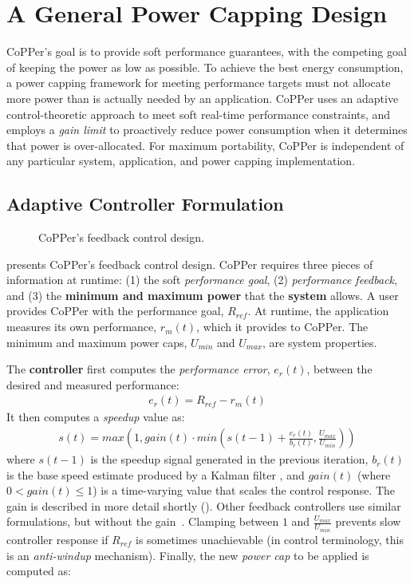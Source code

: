\section{A General Power Capping Design}
\label{sec:copper-framework}

CoPPer's goal is to provide soft performance guarantees, with the competing goal of keeping the power as low as possible.
To achieve the best energy consumption, a power capping framework for meeting performance targets must not allocate more power than is actually needed by an application.
CoPPer uses an adaptive control-theoretic approach to meet soft real-time performance constraints, and employs a \emph{gain limit} to proactively reduce power consumption when it determines that power is over-allocated.
For maximum portability, CoPPer is independent of any particular system, application, and power capping implementation.


\subsection{Adaptive Controller Formulation}

\begin{figure}[t]
  \centering
  
  \caption{CoPPer's feedback control design.}
  \label{fig:copper-runtime}
\end{figure}

 presents CoPPer's feedback control design.
CoPPer requires three pieces of information at runtime: (1) the soft \emph{performance goal}, (2) \emph{performance feedback}, and (3) the \textbf{minimum and maximum power} that the \textbf{system} allows.
A user provides CoPPer with the performance goal, $R_{ref}$.
At runtime, the application measures its own performance, $r_m(t)$, which it provides to CoPPer.
The minimum and maximum power caps, $U_{min}$ and $U_{max}$, are system properties.

The \textbf{controller} first computes the \emph{performance error}, $e_r(t)$, between the desired and measured performance:
\begin{eqnarray}
  e_r(t) = R_{ref} - r_m(t)
  \label{eqn:copper-error}
\end{eqnarray}
It then computes a \emph{speedup} value as:
\begin{eqnarray}
  s(t) = max\left(1, gain(t) \cdot min\left(s(t-1) + \frac{e_r(t)}{b_r(t)}, \frac{U_{max}}{U_{min}}\right)\right)
  \label{eqn:copper-speedup-control}
\end{eqnarray}
where $s(t-1)$ is the speedup signal generated in the previous iteration, $b_r(t)$ is the base speed estimate produced by a Kalman filter \cite{welch2006kalman}, and $gain(t)$ (where $0 < gain(t) \le 1$) is a time-varying value that scales the control response.
The gain is described in more detail shortly ().
Other feedback controllers use similar formulations, but without the gain~\cite{Bard,POET}.
Clamping between $1$ and $\frac{U_{max}}{U_{min}}$ prevents slow controller response if $R_{ref}$ is sometimes unachievable (in control terminology, this is an \emph{anti-windup} mechanism).
Finally, the new \emph{power cap} to be applied is computed as:

